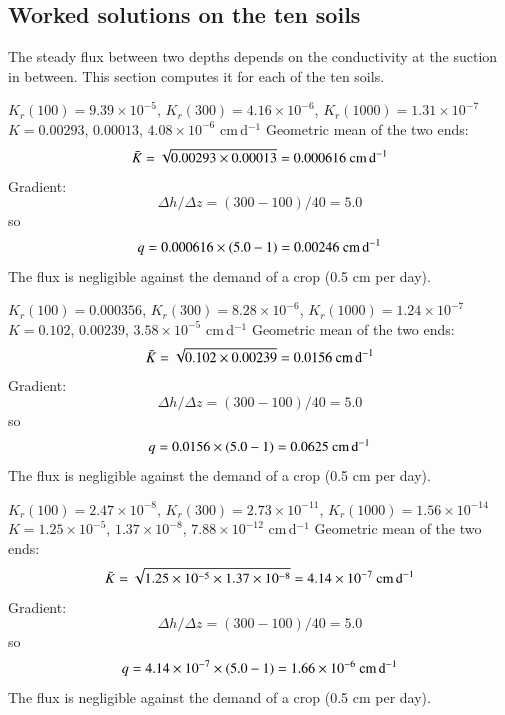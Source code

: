 \subsection{Worked solutions on the ten soils}
The steady flux between two depths depends on the conductivity at the suction in between. This section computes it for each of the ten soils.

\sol {}\ans $K_r(100)=9.39\times10^{-5}$, $K_r(300)=4.16\times10^{-6}$, $K_r(1000)=1.31\times10^{-7}$ \ans $K=0.00293$, $0.00013$, $4.08\times10^{-6}$ cm\,d$^{-1}$ \ans Geometric mean of the two ends: \[\bar K=\sqrt{0.00293\times0.00013}=0.000616\ \text{cm\,d$^{-1}$}\] \ans Gradient: \[\Delta h/\Delta z=(300-100)/40=5.0\]
so \[q=0.000616\times(5.0-1)=0.00246\ \text{cm\,d$^{-1}$}\] \ans The flux is negligible against the demand of a crop (0.5 cm per day). \finans

\sol {}\ans $K_r(100)=0.000356$, $K_r(300)=8.28\times10^{-6}$, $K_r(1000)=1.24\times10^{-7}$ \ans $K=0.102$, $0.00239$, $3.58\times10^{-5}$ cm\,d$^{-1}$ \ans Geometric mean of the two ends: \[\bar K=\sqrt{0.102\times0.00239}=0.0156\ \text{cm\,d$^{-1}$}\] \ans Gradient: \[\Delta h/\Delta z=(300-100)/40=5.0\]
so \[q=0.0156\times(5.0-1)=0.0625\ \text{cm\,d$^{-1}$}\] \ans The flux is negligible against the demand of a crop (0.5 cm per day). \finans

\sol {}\ans $K_r(100)=2.47\times10^{-8}$, $K_r(300)=2.73\times10^{-11}$, $K_r(1000)=1.56\times10^{-14}$ \ans $K=1.25\times10^{-5}$, $1.37\times10^{-8}$, $7.88\times10^{-12}$ cm\,d$^{-1}$ \ans Geometric mean of the two ends: \[\bar K=\sqrt{1.25\times10^{-5}\times1.37\times10^{-8}}=4.14\times10^{-7}\ \text{cm\,d$^{-1}$}\] \ans Gradient: \[\Delta h/\Delta z=(300-100)/40=5.0\]
so \[q=4.14\times10^{-7}\times(5.0-1)=1.66\times10^{-6}\ \text{cm\,d$^{-1}$}\] \ans The flux is negligible against the demand of a crop (0.5 cm per day). \finans

